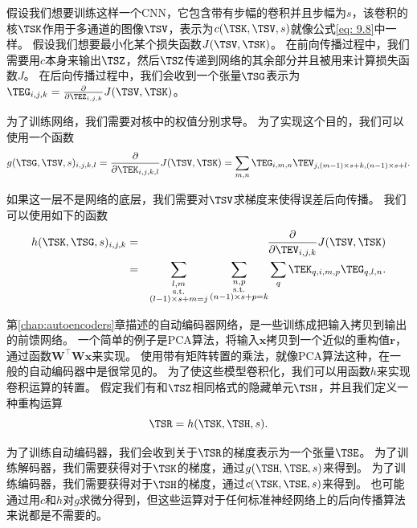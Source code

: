  
假设我们想要训练这样一个\gls{CNN}，它包含带有步幅的卷积并且步幅为$s$，该卷积的核$\TSK$作用于多通道的图像$\TSV$，表示为$c(\TSK, \TSV, s)$就像公式\ref{eq: 9.8}中一样。
假设我们想要最小化某个损失函数$J(\TSV, \TSK)$。
在前向传播过程中，我们需要用$c$本身来输出$\TSZ$，然后$\TSZ$传递到网络的其余部分并且被用来计算损失函数$J$。
在后向传播过程中，我们会收到一个张量$\TSG$表示为$\TEG_{i, j, k} = \frac{\partial}{\partial \TEZ_{i, j, k}} J(\TSV, \TSK)$。

为了训练网络，我们需要对核中的权值分别求导。
为了实现这个目的，我们可以使用一个函数
\begin{equation}
g(\TSG, \TSV, s)_{i, j, k, l} = \frac{\partial}{\partial \TEK_{i, j, k, l}} J(\TSV, \TSK) = \sum_{m, n} \TEG_{i, m, n} \TEV_{j, (m-1)\times s+k, (n-1)\times s+l}.
\end{equation}

如果这一层不是网络的底层，我们需要对$\TSV$求梯度来使得误差后向传播。
我们可以使用如下的函数
\begin{eqnarray}
h(\TSK, \TSG, s)_{i, j, k} &=& \frac{\partial }{\partial \TEV_{i, j, k}} J(\TSV, \TSK)\\
&=& \sum_{\substack{l, m\\
                  \text{s.t.}\\
                  (l-1)\times s+m = j}} \sum_{\substack{n, p\\
                                                            \text{s.t.}\\
                                                            (n-1)\times s +p = k}}
            \sum_q \TEK_{q,i,m,p} \TEG_{q, l, n}.
\end{eqnarray}

第\ref{chap:autoencoders}章描述的自动编码器网络，是一些训练成把输入拷贝到输出的前馈网络。
一个简单的例子是PCA算法，将输入$\bm{x}$拷贝到一个近似的重构值$\bm{r}$，通过函数$\bm{W}^\top \bm{Wx}$来实现。
使用带有矩阵转置的乘法，就像PCA算法这种，在一般的自动编码器中是很常见的。
为了使这些模型卷积化，我们可以用函数$h$来实现卷积运算的转置。
假定我们有和$\TSZ$相同格式的隐藏单元$\TSH$，并且我们定义一种重构运算
\begin{equation}
\TSR = h(\TSK, \TSH, s).
\end{equation}

为了训练自动编码器，我们会收到关于$\TSR$的梯度表示为一个张量$\TSE$。
为了训练解码器，我们需要获得对于$\TSK$的梯度，通过$g(\TSH, \TSE, s)$来得到。
为了训练编码器，我们需要获得对于$\TSH$的梯度，通过$c(\TSK, \TSE, s)$来得到。
也可能通过用$c$和$h$对$g$求微分得到，但这些运算对于任何标准神经网络上的后向传播算法来说都是不需要的。
 
